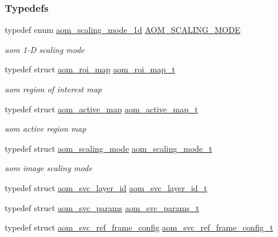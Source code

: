 \subsubsection*{Typedefs}
\begin{DoxyCompactItemize}
\item 
typedef enum \hyperlink{group__aom__encoder_ga2a1791d26fca39303154f0f9ece3e295}{aom\+\_\+scaling\+\_\+mode\+\_\+1d} \hyperlink{group__aom__encoder_ga6694eedd50b128415a3434404c56d73d}{A\+O\+M\+\_\+\+S\+C\+A\+L\+I\+N\+G\+\_\+\+M\+O\+DE}
\begin{DoxyCompactList}\small\item\em aom 1-\/D scaling mode \end{DoxyCompactList}\item 
typedef struct \hyperlink{structaom__roi__map}{aom\+\_\+roi\+\_\+map} \hyperlink{group__aom__encoder_gae682e0031e08270a2e0a60928305a830}{aom\+\_\+roi\+\_\+map\+\_\+t}
\begin{DoxyCompactList}\small\item\em aom region of interest map \end{DoxyCompactList}\item 
typedef struct \hyperlink{structaom__active__map}{aom\+\_\+active\+\_\+map} \hyperlink{group__aom__encoder_gaaba582f3bd806cb3a0a6b8a66c1041e5}{aom\+\_\+active\+\_\+map\+\_\+t}
\begin{DoxyCompactList}\small\item\em aom active region map \end{DoxyCompactList}\item 
typedef struct \hyperlink{structaom__scaling__mode}{aom\+\_\+scaling\+\_\+mode} \hyperlink{group__aom__encoder_ga8d9d932b058ba7e762cd39d403dd4e68}{aom\+\_\+scaling\+\_\+mode\+\_\+t}
\begin{DoxyCompactList}\small\item\em aom image scaling mode \end{DoxyCompactList}\item 
typedef struct \hyperlink{structaom__svc__layer__id}{aom\+\_\+svc\+\_\+layer\+\_\+id} \hyperlink{group__aom__encoder_ga3d1f06a321cd47c869ab16a290437f5c}{aom\+\_\+svc\+\_\+layer\+\_\+id\+\_\+t}
\item 
typedef struct \hyperlink{structaom__svc__params}{aom\+\_\+svc\+\_\+params} \hyperlink{group__aom__encoder_gae81f243c083ca796ca62668f074f8fe9}{aom\+\_\+svc\+\_\+params\+\_\+t}
\item 
typedef struct \hyperlink{structaom__svc__ref__frame__config}{aom\+\_\+svc\+\_\+ref\+\_\+frame\+\_\+config} \hyperlink{group__aom__encoder_ga23962dd5c557ff4ffba600a510ae38ab}{aom\+\_\+svc\+\_\+ref\+\_\+frame\+\_\+config\+\_\+t}
\end{DoxyCompactItemize}
